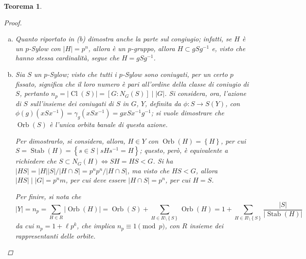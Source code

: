 \documentclass[11pt]{scrartcl}
\theoremstyle{style1}
\newtheorem{teorema}{Teorema}[section]
\numberwithin{equation}{subsection}
\begin{document}
\begin{teorema}
\begin{proof}
\begin{enumerate}[(a).]
				Si considera l'azione di $H$ su $G / S = X$ definita da
				\[
					\varphi : 
					\begin{array}
						{c c c}
						H &\longrightarrow & S(X)\\
						h&\longmapsto & \varphi _h
					\end{array}, \text{ con } \varphi _h(gS) = hgS
				\] 
				Per la formula delle classi:
				\[
				m = \lvert X \rvert = \sum_{g \in R}^{} \lvert \operatorname{Orb} (g S) \rvert = \sum_{g \in R}^{} \frac{\lvert H \rvert }{\lvert \operatorname{Stab} (gS) \rvert } = \sum_{g \in R}^{} p^{a _g} 
				\] 
				dove $R$ \`e l'insieme dei rappresentanti delle classi di $G/S$ e $a_g$ \`e un esponente dipendente dal $g$ in $R$.
				Visto che $p  \nmid m $\footnote{Questo \`e per assunzione, cio\`e $\lvert G \rvert =p^n m $ con $(p,m) = 1$.}, deve esistere un $g \in R$ tale che $a_g=0$, per cui $\operatorname{Orb} (gS) = \left\{ gS \right\} \Rightarrow \operatorname{Stab} (gS) = H$.
				Questo significa anche che $\forall h\in H, \ hgS = gS \Rightarrow H \subset gSg^{-1}$, ma $gSg^{-1}$ \`e un $p$-Sylow perch\'e $\lvert gSg^{-1} \rvert = \lvert S \rvert $, quindi $H$ \`e contenuto in un $p$-Sylow.
			\item Quanto riportato in (b) dimostra anche la parte sul congiugio; infatti, se $H$ \`e un $p$-Sylow con $\lvert H\rvert = p^n$, allora \`e un $p$-gruppo, allora $H \subset gSg^{-1}$ e, visto che hanno stessa cardinalit\`a, segue che $H = g S g^{-1}$.
			\item Sia $S$ un $p$-Sylow; visto che tutti i $p$-Sylow sono coniugati, per un certo $p$ fissato, significa che il loro numero \`e pari all'ordine della classe di coniugio di $S$, pertanto $n_p = \lvert \operatorname{Cl} (S) \rvert  = [G:N_G(S)]  \mid  |G|$.
				Si considera, ora, l'azione di $S$ sull'insieme dei coniugati di $S$ in $G$, $Y$, definita da $\phi :S \to S(Y)$, con $\phi (g)(xSx^{-1}) = \gamma_g (xSx^{-1}) = gxSx^{-1}g^{-1}$; si vuole dimostrare che $\operatorname{Orb} (S)$ \`e l'unica orbita banale di questa azione.

				Per dimostrarlo, si considera, allora, $H \in Y$ con $\operatorname{Orb} (H) = \left\{ H \right\} $, per cui $S = \operatorname{Stab}(H) = \left\{ s \in S  \mid s H s^{-1} = H\right\}  $; questo, per\`o, \`e equivalente a richiedere che $S \subset  N_G(H) \iff SH = HS < G$.
				Si ha $\lvert HS \rvert = \lvert H \rvert \lvert S \rvert  / \lvert H \cap S \rvert = p^np^n / \lvert H\cap S \rvert $, ma visto che $HS < G$, allora $\lvert HS \rvert  \mid |G| = p^nm$, per cui deve essere $\lvert H\cap S \rvert =p^n$, per cui $H = S$.

				Per finire, si nota che
				\[
				\lvert Y \rvert =n_p = \sum_{H \in R}^{} \lvert \operatorname{Orb} (H) \rvert = \operatorname{Orb} (S) + \sum_{H \in R \setminus\left\{ S \right\} }^{} \operatorname{Orb} (H) = 1 + \sum_{H \in R \setminus\left\{ S \right\} }^{} \frac{\lvert S \rvert }{\lvert \operatorname{Stab} (H) \rvert }
				\] 
				da cui $n_p = 1 + \ell p^k$, che implica $n_p \equiv 1 \pmod{p} $, con $R$ insieme dei rappresentanti delle orbite.
		\end{enumerate}
	\end{proof}
\end{teorema}
\end{document}
